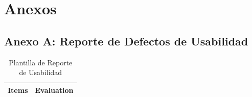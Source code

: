 \documentclass[stu, 12pt, letterpaper, donotrepeattitle, floatsintext, natbib]{apa7}
\begin{document}
\newpage
\section{\large Anexos}

\subsection{Anexo A: Reporte de Defectos de Usabilidad} \label{tab:reporte_usabilidad}

\begin{longtable}{|>{\raggedright\arraybackslash}p{10cm}|>{\centering\arraybackslash}p{3cm}|}
    \caption{Plantilla de Reporte de Usabilidad} \label{tab:reporte_usabilidad} \\
    \hline
    \textbf{Items} & \textbf{Evaluation} \\ \hline
    

\end{longtable}
\end{document}
